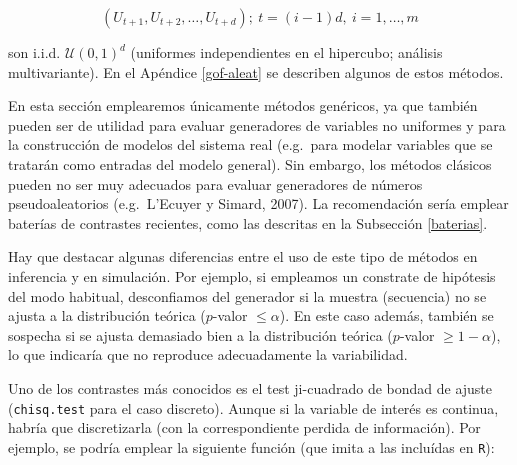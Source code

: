 \documentclass[
]{book}
\theoremstyle{break}
\theoremstyle{definition}
\theoremstyle{definition}
\theoremstyle{definition}
\theoremstyle{remark}
\begin{document}
\[(U_{t+1},U_{t+2},\ldots,U_{t+d}); \ t=(i-1)d, \ i=1,\ldots,m\]

son i.i.d. \(\mathcal{U}\left(0,1\right)^{d}\) (uniformes independientes en el hipercubo; análisis multivariante).
En el Apéndice \ref{gof-aleat} se describen algunos de estos métodos.

En esta sección emplearemos únicamente métodos genéricos, ya que también pueden ser de utilidad para evaluar generadores de variables no uniformes y para la construcción de modelos del sistema real (e.g.~para modelar variables que se tratarán como entradas del modelo general).
Sin embargo, los métodos clásicos pueden no ser muy adecuados para evaluar generadores de números pseudoaleatorios (e.g.~L'Ecuyer y Simard, 2007).
La recomendación sería emplear baterías de contrastes recientes, como las descritas en la Subsección \ref{baterias}.

Hay que destacar algunas diferencias entre el uso de este tipo de métodos en inferencia y en simulación.
Por ejemplo, si empleamos un constrate de hipótesis del modo habitual, desconfiamos del generador si la muestra (secuencia) no se ajusta a la distribución teórica (\(p\)-valor \(\leq \alpha\)).
En este caso además, también se sospecha si se ajusta demasiado
bien a la distribución teórica (\(p\)-valor \(\geq1-\alpha\)),
lo que indicaría que no reproduce adecuadamente la variabilidad.

Uno de los contrastes más conocidos es el test ji-cuadrado de bondad de ajuste
(\texttt{chisq.test} para el caso discreto).
Aunque si la variable de interés es continua, habría que discretizarla
(con la correspondiente perdida de información).
Por ejemplo, se podría emplear la siguiente función
(que imita a las incluídas en \texttt{R}):
\end{document}
